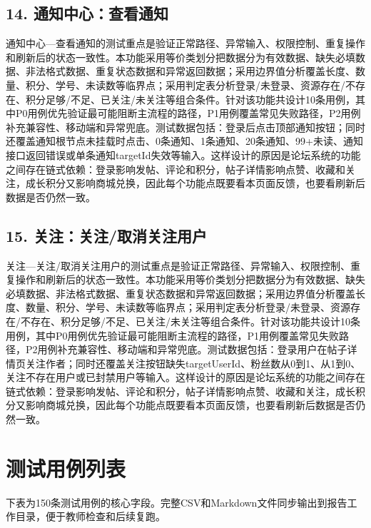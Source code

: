 \documentclass[UTF8,zihao=-4]{ctexart}
\begin{document}
\subsection{14. 通知中心：查看通知}
通知中心—查看通知的测试重点是验证正常路径、异常输入、权限控制、重复操作和刷新后的状态一致性。本功能采用等价类划分把数据分为有效数据、缺失必填数据、非法格式数据、重复状态数据和异常返回数据；采用边界值分析覆盖长度、数量、积分、学号、未读数等临界点；采用判定表分析登录/未登录、资源存在/不存在、积分足够/不足、已关注/未关注等组合条件。针对该功能共设计10条用例，其中P0用例优先验证最可能阻断主流程的路径，P1用例覆盖常见失败路径，P2用例补充兼容性、移动端和异常兜底。测试数据包括：登录后点击顶部通知按钮；同时还覆盖通知根节点未挂载时点击、0条通知、1条通知、20条通知、99+未读、通知接口返回错误或单条通知targetId失效等输入。这样设计的原因是论坛系统的功能之间存在链式依赖：登录影响发帖、评论和积分，帖子详情影响点赞、收藏和关注，成长积分又影响商城兑换，因此每个功能点既要看本页面反馈，也要看刷新后数据是否仍然一致。

\subsection{15. 关注：关注/取消关注用户}
关注—关注/取消关注用户的测试重点是验证正常路径、异常输入、权限控制、重复操作和刷新后的状态一致性。本功能采用等价类划分把数据分为有效数据、缺失必填数据、非法格式数据、重复状态数据和异常返回数据；采用边界值分析覆盖长度、数量、积分、学号、未读数等临界点；采用判定表分析登录/未登录、资源存在/不存在、积分足够/不足、已关注/未关注等组合条件。针对该功能共设计10条用例，其中P0用例优先验证最可能阻断主流程的路径，P1用例覆盖常见失败路径，P2用例补充兼容性、移动端和异常兜底。测试数据包括：登录用户在帖子详情页关注作者；同时还覆盖关注按钮缺失targetUserId、粉丝数从0到1、从1到0、关注不存在用户或已封禁用户等输入。这样设计的原因是论坛系统的功能之间存在链式依赖：登录影响发帖、评论和积分，帖子详情影响点赞、收藏和关注，成长积分又影响商城兑换，因此每个功能点既要看本页面反馈，也要看刷新后数据是否仍然一致。

\section{测试用例列表}
下表为150条测试用例的核心字段。完整CSV和Markdown文件同步输出到报告工作目录，便于教师检查和后续复跑。
\end{document}
